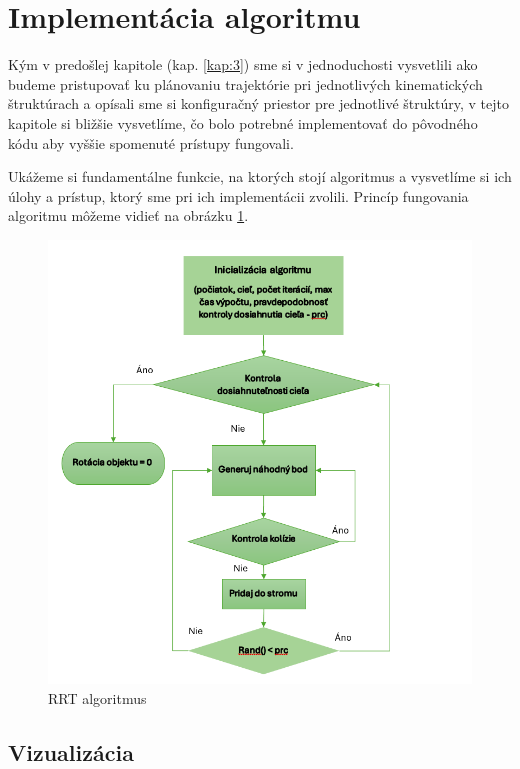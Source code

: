 \section{Implementácia algoritmu}
\label{kap:4}

Kým v predošlej kapitole (kap. \ref{kap:3}) sme si v jednoduchosti vysvetlili ako budeme pristupovať ku plánovaniu trajektórie pri jednotlivých kinematických štruktúrach a opísali sme si konfiguračný priestor pre jednotlivé štruktúry, v tejto kapitole si bližšie vysvetlíme, čo bolo potrebné implementovať do pôvodného kódu aby vyššie spomenuté prístupy fungovali.

Ukážeme si fundamentálne funkcie, na ktorých stojí algoritmus a vysvetlíme si ich úlohy a prístup, ktorý sme pri ich implementácii zvolili.
Princíp fungovania algoritmu môžeme vidieť na obrázku \ref{OBRAZOK 4.16}.


\begin{figure}[h!]
	\centering
	\includegraphics[width=140mm]{img/VD_RRT.png}
	\caption{RRT algoritmus} \label{OBRAZOK 4.16} 
\end{figure}


\subsection{Vizualizácia}

